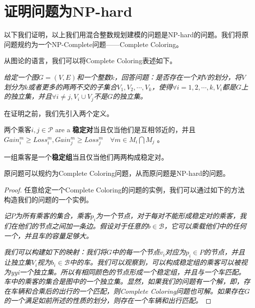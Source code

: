\section{证明问题为NP-hard}
以下我们证明，以上我们用混合整数规划建模的问题是NP-hard的问题。我们将原问题规约为一个NP-Complete问题——Complete Coloring。
\par
从图论的语言，我们可以将Complete Coloring表述如下。
\par
\textit{给定一个图$G = (V,E)$和一个整数$k$，回答问题：是否存在一个对$V$的划分，将$V$划分为$k$或者更多的两两不交的子集合$V_1,V_2,\cdots,V_k$，使得$\forall i=1,2,\cdots,k, V_i$都是$G$上的独立集，并且$\forall i\neq j, V_i\cup V_j$不是$G$的独立集。
}
\par
在证明之前，我们先引入两个定义。
\begin{definition}[稳定对]
两个乘客$i,j\in\mathcal{P}$ are a \textbf{稳定对}当且仅当他们是互相邻近的，并且$Gain^m_i\geq Loss^m_i, Gain^m_j\geq Loss^m_j  \quad\forall m\in M_i\bigcap M_j$ 。
\end{definition}
\begin{definition}[稳定组]
一组乘客是一个\textrm{\textbf{稳定组}}当且仅当他们两两构成\textrm{稳定对}。
\end{definition}
\begin{theorem}
原问题可以规约为Complete Coloring问题，从而原问题是NP-hard的问题。
\end{theorem}
\begin{proof}
任意给定一个Complete Coloring的问题的实例，我们可以通过如下的方法构造我们的问题的一个实例。
\par
\textit{
记$P$为所有乘客的集合，乘客$p_i$为一个节点，对于每对不能形成稳定对的乘客，我们在他们的节点之间加一条边。假设对于任意的$b\in \mathcal{B}$，它可以乘载他们中的任何一个，并且车的容量足够大。
}
\par
\textit{
我们可以构建如下的映射：我们将$G$中的每一个节点$v_i$对应为$p_i\in P$的节点，并且让独立集$V_i$视为$b_i\in\mathcal{B}$中的车。我们可以观察到，可以构成稳定组的乘客可以被视为yyi一个独立集。所以有相同颜色的节点形成一个稳定组，并且与一个车匹配。车中的乘客的集合是图中的一个独立集。显然，如果我们的问题有一个解，即，存在车辆和合乘后的出行的一个匹配，则Complete Coloring问题也可解。如果存在$G$的一个满足如前所述的性质的划分，则存在一个车辆和出行匹配。
}
\end{proof}

